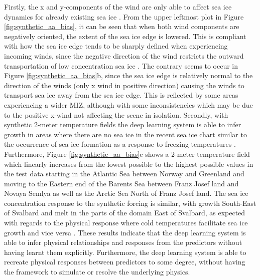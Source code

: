 \documentclass[../main/thesis]{subfiles}
\begin{document}
Firstly, the x and y-components of the wind are only able to affect sea ice dynamics for already existing sea ice \citep{Spreen2011, Yu2020}. From the upper leftmost plot in Figure \ref{fig:synthetic_aa_bias}, it can be seen that when both wind components are negatively oriented, the extent of the sea ice edge is lowered. This is compliant with how the sea ice edge tends to be sharply defined when experiencing incoming winds, since the negative direction of the wind restricts the outward transportation of low concentration sea ice \citep{Yu2020}. The contrary seems to occur in Figure \ref{fig:synthetic_aa_bias}b, since the sea ice edge is relatively normal to the direction of the winds (only x wind in positive direction) causing the winds to transport sea ice away from the sea ice edge. This is reflected by some areas experiencing a wider MIZ, although with some inconsistencies which may be due to the positive x-wind not affecting the scene in isolation. Secondly, with synthetic 2-meter temperature fields the deep learning system is able to infer growth in areas where there are no sea ice in the recent sea ice chart similar to the occurrence of sea ice formation as a response to freezing temperatures \citep{Hibler1979}. Furthermore, Figure \ref{fig:synthetic_aa_bias}c shows a 2-meter temperature field which linearly increases from the lowest possible to the highest possible values in the test data starting in the Atlantic Sea between Norway and Greenland and moving to the Eastern end of the Barents Sea between Franz Josef land and Novaya Semlya as well as the Arctic Sea North of Franz Josef land. The sea ice concentration response to the synthetic forcing is similar, with growth South-East of Svalbard and melt in the parts of the domain East of Svalbard, as expected with regards to the physical response where cold temperatures facilitate sea ice growth and vice versa \citep{Hibler1979}. These results indicate that the deep learning system is able to infer physical relationships and responses from the predictors without having learnt them explicitly. Furthermore, the deep learning system is able to recreate physical responses between predictors to some degree, without having the framework to simulate or resolve the underlying physics.
\end{document}
